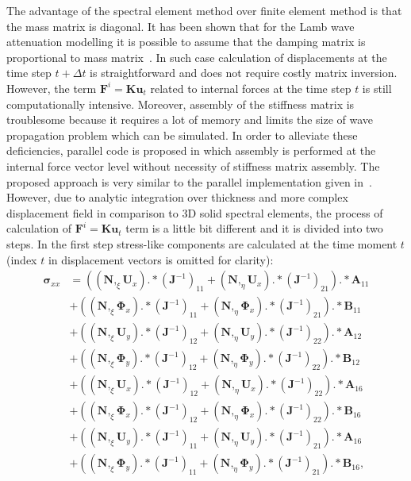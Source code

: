 \documentclass[preprint,12pt]{elsarticle}
\renewcommand{\vec}[1]{\mathbf{#1}}
\renewcommand{\bm}[1]{\mathbf{#1}}
\newcommand{\bs}[1]{\boldsymbol{#1}}
\begin{document}
	The advantage of the spectral element method over finite element method is that the mass matrix is diagonal. It has been shown that for the Lamb wave attenuation modelling it is possible to assume that the damping matrix is proportional to mass matrix~\cite{Wandowski2017}. In such case calculation of displacements at the time step $t + \Delta t$ is straightforward and does not require costly matrix inversion. However, the term $\vec{F}^i=\bm{K}\vec{u}_t$ related to internal forces at the time step $t$ is still computationally intensive. Moreover, assembly of the stiffness matrix is troublesome because it requires a lot of memory and limits the size of wave propagation problem which can be simulated. In order to alleviate these deficiencies, parallel code is proposed in which assembly is performed at the internal force vector level without necessity of stiffness matrix assembly. The proposed approach is very similar to the parallel implementation given in~\cite{Kudela2016}. However, due to analytic integration over thickness and more complex displacement field in comparison to 3D solid spectral elements, the process of calculation of $\vec{F}^i=\bm{K}\vec{u}_t$ term is a little bit different and it is divided into two steps. In the first step stress-like components are calculated at the time moment $t$ (index $t$ in displacement vectors is omitted for clarity):
	\begin{equation}
	\begin{split}
	\bs{\sigma}_{xx}&=\left((\bm{N},_{\xi}\vec{U}_x).*(\vec{J}^{-1})_{11}+(\bm{N},_{\eta}\vec{U}_x).*(\vec{J}^{-1})_{21}\right).*\vec{A}_{11}\\
	&+\left((\bm{N},_{\xi}\bs{\Phi}_x).*(\vec{J}^{-1})_{11}+(\bm{N},_{\eta}\bs{\Phi}_x).*(\vec{J}^{-1})_{21}\right).*\vec{B}_{11}\\
	&+\left((\bm{N},_{\xi}\vec{U}_y).*(\vec{J}^{-1})_{12}+(\bm{N},_{\eta}\vec{U}_y).*(\vec{J}^{-1})_{22}\right).*\vec{A}_{12}\\
	&+\left((\bm{N},_{\xi}\bs{\Phi}_y).*(\vec{J}^{-1})_{12}+(\bm{N},_{\eta}\bs{\Phi}_y).*(\vec{J}^{-1})_{22}\right).*\vec{B}_{12}\\
	&+\left((\bm{N},_{\xi}\vec{U}_x).*(\vec{J}^{-1})_{12}+(\bm{N},_{\eta}\vec{U}_x).*(\vec{J}^{-1})_{22}\right).*\vec{A}_{16}\\
	&+\left((\bm{N},_{\xi}\bs{\Phi}_x).*(\vec{J}^{-1})_{12}+(\bm{N},_{\eta}\bs{\Phi}_x).*(\vec{J}^{-1})_{22}\right).*\vec{B}_{16}\\
	&+\left((\bm{N},_{\xi}\vec{U}_y).*(\vec{J}^{-1})_{11}+(\bm{N},_{\eta}\vec{U}_y).*(\vec{J}^{-1})_{21}\right).*\vec{A}_{16}\\
	&+\left((\bm{N},_{\xi}\bs{\Phi}_y).*(\vec{J}^{-1})_{11}+(\bm{N},_{\eta}\bs{\Phi}_y).*(\vec{J}^{-1})_{21}\right).*\vec{B}_{16},
	\end{split}
	\end{equation}
\end{document}
